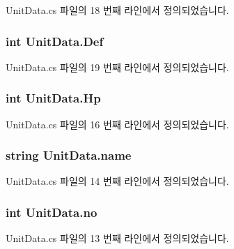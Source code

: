 Unit\+Data.\+cs 파일의 18 번째 라인에서 정의되었습니다.

\subsubsection[{\texorpdfstring{Def}{Def}}]{\setlength{\rightskip}{0pt plus 5cm}int Unit\+Data.\+Def}\hypertarget{class_unit_data_a226d1ebed11200b155e66ea3d5189321}{}\label{class_unit_data_a226d1ebed11200b155e66ea3d5189321}


Unit\+Data.\+cs 파일의 19 번째 라인에서 정의되었습니다.

\subsubsection[{\texorpdfstring{Hp}{Hp}}]{\setlength{\rightskip}{0pt plus 5cm}int Unit\+Data.\+Hp}\hypertarget{class_unit_data_a4eab1aa57a762cf2df5053d678a4c788}{}\label{class_unit_data_a4eab1aa57a762cf2df5053d678a4c788}


Unit\+Data.\+cs 파일의 16 번째 라인에서 정의되었습니다.

\subsubsection[{\texorpdfstring{name}{name}}]{\setlength{\rightskip}{0pt plus 5cm}string Unit\+Data.\+name}\hypertarget{class_unit_data_a7aa329703ed47d3d717cbe3343133ad8}{}\label{class_unit_data_a7aa329703ed47d3d717cbe3343133ad8}


Unit\+Data.\+cs 파일의 14 번째 라인에서 정의되었습니다.

\subsubsection[{\texorpdfstring{no}{no}}]{\setlength{\rightskip}{0pt plus 5cm}int Unit\+Data.\+no}\hypertarget{class_unit_data_a45de9d7b5ceb45a81feca29b67e1c46c}{}\label{class_unit_data_a45de9d7b5ceb45a81feca29b67e1c46c}


Unit\+Data.\+cs 파일의 13 번째 라인에서 정의되었습니다.

